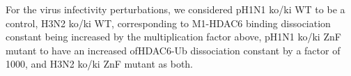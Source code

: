 For the virus infectivity perturbations, we considered pH1N1 ko/ki WT to be a control, H3N2 ko/ki WT, corresponding to M1-HDAC6 binding dissociation constant being increased by the multiplication factor above, pH1N1 ko/ki ZnF mutant to have an increased ofHDAC6-Ub dissociation constant by a factor of 1000, and H3N2 ko/ki ZnF mutant as both.
